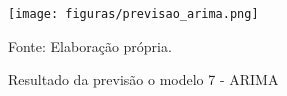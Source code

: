 \documentclass[
article, %
12pt, %
oneside, %
a4paper, %
portuguese, %
portuguese %
]{abntex2}
\begin{document}
\begin{figure}[H]
    \centering
    \caption{Resultado da previsão o modelo 7 - ARIMA}
    \texttt{[image: figuras/previsao\_arima.png]}
    \begin{flushleft}
    Fonte: Elaboração própria.
    \end{flushleft}
    \label{fig:09}
\end{figure}

\newpage
%

\end{document}
